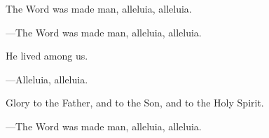 \responsory

\begin{hangpar}
The Word was made man, alleluia, alleluia.

{\color{red}---\thinspace }The Word was made man, alleluia, alleluia.

\medskip He lived among us.

{\color{red}---\thinspace }Alleluia, alleluia.

\medskip Glory to the Father, and to the Son, and to the Holy Spirit.

{\color{red}---\thinspace }The Word was made man, alleluia, alleluia.
\end{hangpar}
